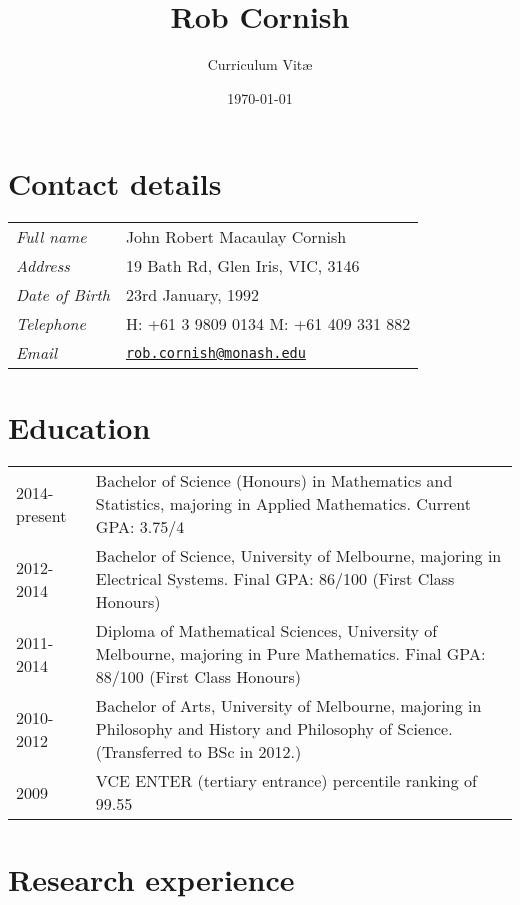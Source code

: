 \documentclass[12pt,a4paper]{article}
\title{\bfseries \huge Rob Cornish}
\author{Curriculum Vit\ae}
\date{\today}
\newcommand{\mailto}[1]{\href{mailto:#1}{\texttt{#1}}}
\newenvironment{llist}
	{\renewcommand{\arraystretch}{1.5}\begin{longtable}{p{3.5cm} p{12cm}}}
	{\end{longtable}}
\begin{document}
\maketitle

\thispagestyle{empty}

\section*{Contact details}
\begin{llist}
	\textit{Full name} & John Robert Macaulay Cornish \\
	\textit{Address} & 19 Bath Rd, Glen Iris, VIC, 3146 \\
	\textit{Date of Birth} & 23rd January, 1992 \\
	\textit{Telephone} & H: +61 3 9809 0134 \newline M: +61 409 331 882 \\
	\textit{Email} & \mailto{rob.cornish@monash.edu}
\end{llist}

\section*{Education}

\begin{llist}
  2014-present & Bachelor of Science (Honours) in Mathematics and Statistics,
  majoring in Applied Mathematics. Current GPA: 3.75/4 \\ 
  2012-2014 & Bachelor of Science, University of Melbourne, majoring in
  Electrical Systems. Final GPA: 86/100 (First Class Honours) \\
  2011-2014 & Diploma of Mathematical Sciences, University of Melbourne,
  majoring in Pure Mathematics. Final GPA: 88/100 (First Class Honours) \\
  2010-2012 & Bachelor of Arts, University of Melbourne, majoring in Philosophy
  and History and Philosophy of Science. (Transferred to BSc in 2012.) \\
	2009 & VCE ENTER (tertiary entrance) percentile ranking of 99.55
\end{llist}

\section*{Research experience}
\end{document}
